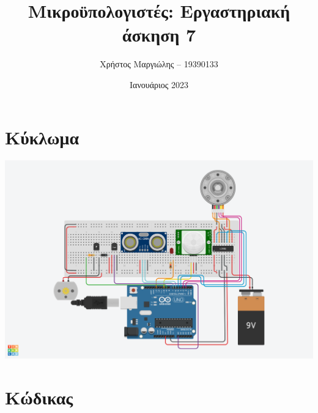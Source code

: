 \documentclass{article}
\title{Μικροϋπολογιστές: Εργαστηριακή άσκηση 7}
\author{Χρήστος Μαργιώλης -- 19390133}
\date{Ιανουάριος 2023}
\begin{document}
\begin{titlepage}
        \maketitle
\end{titlepage}

\section{Κύκλωμα}

\includegraphics[width=\linewidth]{door.png}
\pagebreak

\section{Κώδικας}


\end{document}

